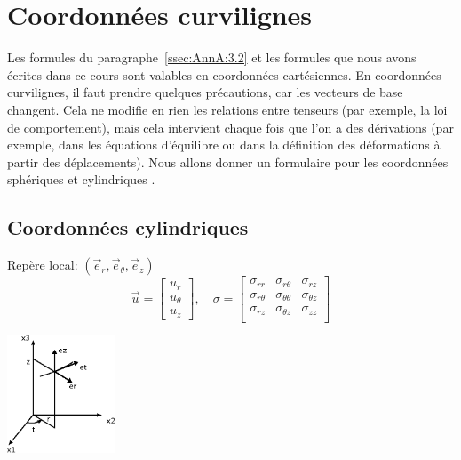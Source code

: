 \section{Coordonnées curvilignes}
Les formules du paragraphe~\ref{ssec:AnnA:3.2} et les formules que nous avons écrites dans ce cours sont valables en coordonnées cartésiennes.
En coordonnées curvilignes, il faut prendre quelques précautions, car les vecteurs de base changent.
Cela ne modifie en rien les relations entre tenseurs (par exemple, la loi de comportement), mais cela intervient chaque fois que l'on a des dérivations (par exemple, dans les équations d'équilibre ou dans la définition des déformations à partir des déplacements).
Nous allons donner un formulaire pour les coordonnées sphériques et cylindriques .
\subsection{Coordonnées cylindriques}
\begin{multicols}{2}
\noindent Repère local: $(\vec{e}_r,\vec{e}_{\theta},\vec{e}_{z})$
    \begin{displaymath}
        \vec{u} = 
        \begin{bmatrix}
            u_r \\
            u_{\theta} \\
            u_z
        \end{bmatrix}, \quad
        \mathbb{\sigma} = 
        \begin{bmatrix}
            \sigma_{rr} & \sigma_{r\theta} & \sigma_{rz} \\
            \sigma_{r\theta} & \sigma_{\theta\theta} & \sigma_{\theta z} \\
            \sigma_{rz} & \sigma_{\theta z} & \sigma_{zz} \\
        \end{bmatrix}
    \end{displaymath}
 
    \columnbreak

    \includegraphics[height=3.5cm]{../images/T1_AnnA-0002}

\end{multicols}
